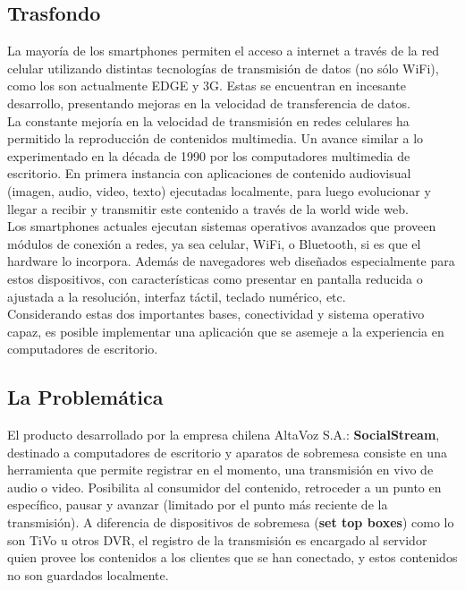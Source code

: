 \subsection{Trasfondo}
La mayoría de los smartphones permiten el acceso a internet a través de la red celular utilizando distintas tecnologías de transmisión de datos (no sólo WiFi), como los son actualmente EDGE y 3G. Estas se encuentran en incesante desarrollo, presentando mejoras en la velocidad de transferencia de datos.\\

La constante mejoría en la velocidad de transmisión en redes celulares ha permitido la reproducción de contenidos multimedia. Un avance similar a lo experimentado en la década de 1990 por los computadores multimedia de escritorio. En primera instancia con aplicaciones de contenido audiovisual (imagen, audio, video, texto) ejecutadas localmente, para luego evolucionar y llegar a recibir y transmitir este contenido a través de la world wide web.\\

Los smartphones actuales ejecutan sistemas operativos avanzados que proveen módulos de conexión  a redes, ya sea celular, WiFi, o Bluetooth, si es que el hardware lo incorpora. Además de navegadores web diseñados especialmente para estos dispositivos, con características como presentar en pantalla reducida o ajustada a la resolución, interfaz táctil, teclado numérico, etc.\\

Considerando estas dos importantes bases, conectividad y sistema operativo capaz, es posible implementar una aplicación que se asemeje a la experiencia en computadores de escritorio.\\

\subsection{La Problemática}
El producto desarrollado por la empresa chilena AltaVoz S.A.: \textbf{SocialStream}, destinado a computadores de escritorio y aparatos de sobremesa consiste en una herramienta que permite registrar en el momento, una transmisión en vivo de audio o video. Posibilita al consumidor del contenido, retroceder a un punto en específico, pausar  y avanzar (limitado por el punto más reciente de la transmisión). 
A diferencia de dispositivos de sobremesa (\textbf{set top boxes}) como lo son TiVo u otros DVR, el registro de la transmisión es encargado al servidor quien provee los contenidos a los clientes que se han conectado, y estos contenidos no son guardados localmente. \\

